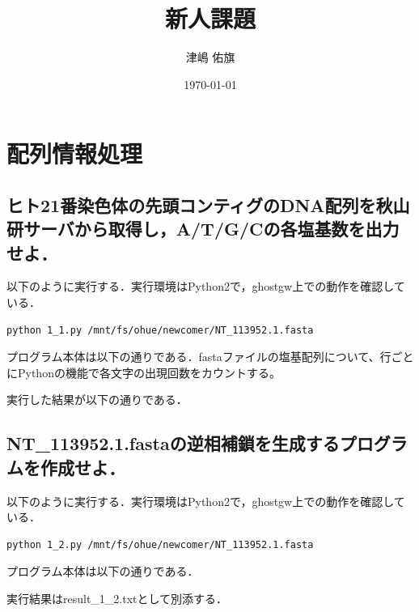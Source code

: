 \documentclass[uplatex,a4j]{jsarticle}
\title{新人課題}
\author{津嶋 佑旗}
\date{\today}
\begin{document}
  \maketitle
  \section{配列情報処理}
  \subsection{ヒト21番染色体の先頭コンティグのDNA配列を秋山研サーバから取得し，A/T/G/Cの各塩基数を出力せよ．}
  以下のように実行する．実行環境はPython2で，ghostgw上での動作を確認している．
  \begin{lstlisting}[caption=実行方法, label=run1]
    python 1_1.py /mnt/fs/ohue/newcomer/NT_113952.1.fasta
  \end{lstlisting}
  プログラム本体は以下の通りである．fastaファイルの塩基配列について、行ごとにPythonの機能で各文字の出現回数をカウントする。
  
  実行した結果が以下の通りである．
  
  
  \subsection{NT\_113952.1.fastaの逆相補鎖を生成するプログラムを作成せよ．}
  以下のように実行する．実行環境はPython2で，ghostgw上での動作を確認している．
  \begin{lstlisting}[caption=実行方法, label=run2]
    python 1_2.py /mnt/fs/ohue/newcomer/NT_113952.1.fasta
  \end{lstlisting}
  プログラム本体は以下の通りである．
  
  
  
  実行結果はresult\_1\_2.txtとして別添する．
  
\end{document}
